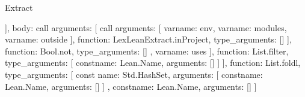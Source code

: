 \begin{lexlean}{Extract}
\begin{toolingmodule}
{{{{{{{{{{{{{{{{{{{{{{                                                              }
                                                            ],
                                                            body: call{
                                                              arguments: [
                                                                call{
                                                                  arguments: [
                                                                    var{name: env},
                                                                    var{name: modules},
                                                                    var{name: outside}
                                                                  ],
                                                                  function: LexLeanExtract.inProject,
                                                                  type_arguments: []
                                                                }
                                                              ],
                                                              function: Bool.not,
                                                              type_arguments: []
                                                            }
                                                          },
                                                          var{name: uses}
                                                        ],
                                                        function: List.filter,
                                                        type_arguments: [
                                                          const{name: Lean.Name, arguments: []}
                                                        ]
                                                      }
                                                    ],
                                                    function: List.foldl,
                                                    type_arguments: [
                                                      const{
                                                        name: Std.HashSet,
                                                        arguments: [
                                                          const{name: Lean.Name, arguments: []}
                                                        ]
                                                      },
                                                      const{name: Lean.Name, arguments: []}
                                                    ]
}}}}}}}}}}}}}}}}}}}
\end{toolingmodule}
\end{lexlean}
